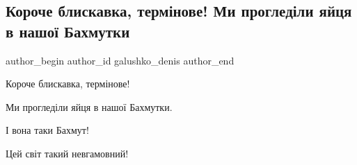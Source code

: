  
 
 
 
 

\subsection{Короче блискавка, термінове! Ми прогледіли яйця в нашої Бахмутки}
\label{sec:27_11_2022.fb.galushko_denis.2.koroche_bliskavka__t}

\ifcmt
 author_begin
   author_id galushko_denis
 author_end
\fi

Короче блискавка, термінове!

Ми прогледіли яйця в нашої Бахмутки.

І вона таки Бахмут!

Цей світ такий невгамовний!
